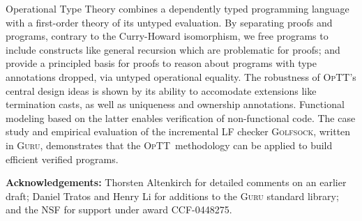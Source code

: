\documentclass[preprint,natbib]{sigplanconf}
\newcommand{\optt}{\textsc{OpTT}}
\begin{document}
Operational Type Theory combines a dependently typed programming
language with a first-order theory of its untyped evaluation.  By
separating proofs and programs, contrary to the Curry-Howard
isomorphism, we free programs to include constructs like general
recursion which are problematic for proofs; and provide a principled
basis for proofs to reason about programs with type annotations
dropped, via untyped operational equality.  The robustness of \optt's
central design ideas is shown by its ability to accomodate extensions
like termination casts, as well as uniqueness and ownership
annotations.  Functional modeling based on the latter enables
verification of non-functional code.  The case study and empirical
evaluation of the incremental LF checker \textsc{Golfsock}, written in
\textsc{Guru}, demonstrates that the \optt\ methodology can be applied
to build efficient verified programs.

\textbf{Acknowledgements:} Thorsten Altenkirch for detailed comments
on an earlier draft; Daniel Tratos and Henry Li for additions to the
\textsc{Guru} standard library; and the NSF for support under award
CCF-0448275.




\end{document}
